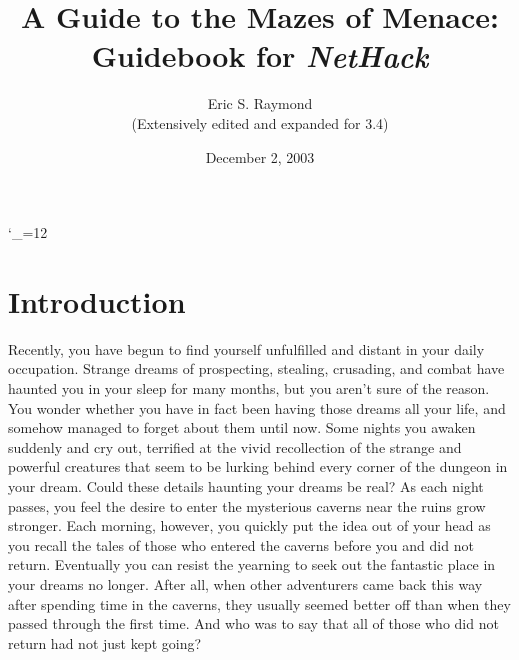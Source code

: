
\textheight 220mm
\textwidth 160mm
\oddsidemargin 0mm
\evensidemargin 0mm
\topmargin 0mm

\newcommand{\nd}{\noindent}

\newcommand{\tb}[1]{\tt #1 \hfill}
\newcommand{\bb}[1]{\bf #1 \hfill}
\newcommand{\ib}[1]{\it #1 \hfill}

\newcommand{\blist}[1]
{\begin{list}{$\bullet$}
    {\leftmargin 30mm \topsep 2mm \partopsep 0mm \parsep 0mm \itemsep 1mm
     \labelwidth 28mm \labelsep 2mm
     #1}}

\newcommand{\elist}{\end{list}}

\catcode`\_=12


%
%

\title{\LARGE A Guide to the Mazes of Menace:\\
\Large Guidebook for {\it NetHack\/}}

\author{Eric S. Raymond\\
(Extensively edited and expanded for 3.4)}
\date{December 2, 2003}

\maketitle

\section{Introduction}


Recently, you have begun to find yourself unfulfilled and distant 
in your daily occupation.  Strange dreams of prospecting, stealing, 
crusading, and combat have haunted you in your sleep for many months, 
but you aren't sure of the reason.  You wonder whether you have in 
fact been having those dreams all your life, and somehow managed to 
forget about them until now.  Some nights you awaken suddenly
and cry out, terrified at the vivid recollection of the strange and 
powerful creatures that seem to be lurking behind every corner of the 
dungeon in your dream.  Could these details haunting your dreams be real?  
As each night passes, you feel the desire to enter the mysterious caverns 
near the ruins grow stronger.  Each morning, however, you quickly put 
the idea out of your head as you recall the tales of those who entered 
the caverns before you and did not return.  Eventually you can resist 
the yearning to seek out the fantastic place in your dreams no longer.  
After all, when other adventurers came back this way after spending time 
in the caverns, they usually seemed better off than when they passed 
through the first time.  And who was to say that all of those who did 
not return had not just kept going?

